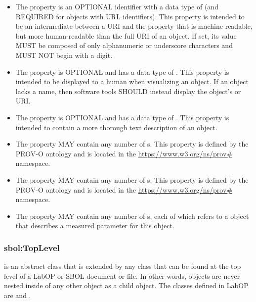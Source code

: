 \begin{itemize}
\item \label{sec:sbol:displayId} 
The  property is an OPTIONAL identifier with a data type of  (and REQUIRED for objects with URL identifiers). This property is intended to be an intermediate between a URI and the  property that is machine-readable, but more human-readable than the full URI of an object.
If set, its  value MUST be composed of only alphanumeric or underscore characters and MUST NOT begin with a digit.

\item \label{sec:sbol:name}
The  property is OPTIONAL and has a data type of . This property is intended to be displayed to a human when visualizing an  object.
If an  object lacks a name, then software tools SHOULD instead display the object's  or URI.

\item \label{sec:sbol:description}
The  property is OPTIONAL and has a data type of . This property is intended to contain a more thorough text description of an  object.

\item \label{sec:prov:wasDerivedFrom}
The  property MAY contain any number of s. This property is defined by the PROV-O ontology and is located in the \url{https://www.w3.org/ns/prov#} namespace.

\item \label{sec:prov:wasGeneratedBy}
The  property MAY contain any number of s. This property is defined by the PROV-O ontology and is located in the \url{https://www.w3.org/ns/prov#} namespace.

\item \label{sec:sbol:hasMeasure}
The  property MAY contain any number of s, each of which refers to a  object that describes a measured parameter for this object.
\end{itemize}

\subsubsection{sbol:TopLevel}
\label{sec:sbol:TopLevel}

 is an abstract class that is extended by any  class that can be found at the top level of a LabOP or SBOL document or file.
In other words,  objects are never nested inside of any other object as a child object.
The  classes defined in LabOP are  and . 

